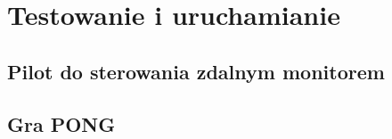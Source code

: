 \newpage
\section{Testowanie i uruchamianie}

\subsection{Pilot do sterowania zdalnym monitorem}

\subsection{Gra PONG}

